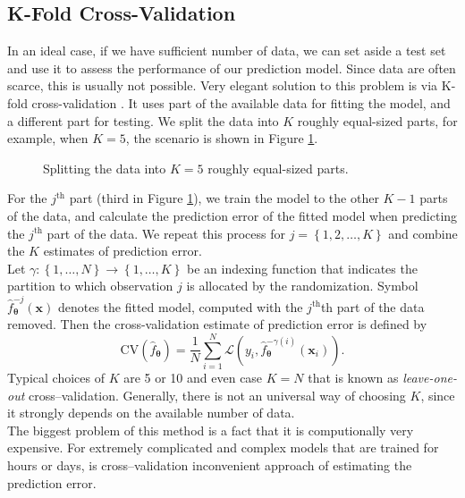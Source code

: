 \subsection{K-Fold Cross-Validation}
In an ideal case, if we have sufficient number of data, we can set aside a test set and use
it to assess the performance of our prediction model. Since data are often
scarce, this is usually not possible. Very elegant solution to this problem is via K-fold cross-validation \cite{statistics}. It
uses part of the available data for fitting the model, and a different
part for testing. We split the data into $K$ roughly equal-sized parts, for
example, when $K = 5$, the scenario is shown in Figure \ref{fig:KFOLD}. 
\begin{figure}[h]
\begin{center}
\end{center}
\caption{Splitting the data into $K=5$ roughly equal-sized parts.}
\label{fig:KFOLD}
\end{figure}

For the $j^{\mathrm{th}}$ part (third in Figure \ref{fig:KFOLD}), we train the model to the other $K-1$ parts
of the data, and calculate the prediction error of the fitted model when
predicting the $j^{\mathrm{th}}$ part of the data. We repeat this process for $j = \left\lbrace 1,2,\dots,K\right\rbrace$ and
combine the $K$ estimates of prediction error.\\
Let $\gamma : \left\lbrace 1,\dots,N\right\rbrace\rightarrow  \left\lbrace 1,\dots,K\right\rbrace$ be an indexing
function that indicates the partition to which observation $j$ is allocated by
the randomization. Symbol $\hat{f}_{\boldsymbol{\theta}}^{-j}\left(\boldsymbol{x}\right)$ denotes the fitted model, computed with
the $j^{\mathrm{th}}$th part of the data removed. Then the cross-validation estimate of
prediction error is defined by
\begin{equation}
\mathrm{CV}\left(\hat{f}_{\boldsymbol{\theta}}\right) = \frac{1}{N}\sum_{i = 1}^{N}\mathcal{L}\left(y_i , \hat{f}_{\boldsymbol{\theta}}^{-\gamma\left(i\right)}\left(\boldsymbol{x}_i\right)\right).
\end{equation}
Typical choices of $K$ are 5 or 10 and even case $K = N$ that is known as \emph{leave-one-out} cross--validation. Generally, there is not an universal way of choosing $K$, since it strongly depends on the available number of data. \\
The biggest problem of this method is a fact that it is computionally very expensive. For extremely complicated and complex models that are trained for hours or days, is cross--validation inconvenient approach of estimating the prediction error. 
